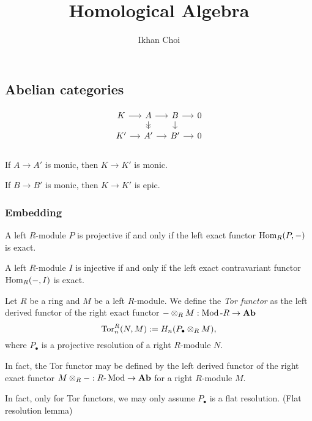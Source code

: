 \documentclass{../../large}
\newcommand{\Ab}{\mathbf{Ab}}
\begin{document}
\title{Homological Algebra}
\author{Ikhan Choi}
\maketitle
\tableofcontents


\part{}

\chapter{Abelian categories}

\[\begin{tikzcd}[sep=small]
K \rar & A \rar\dar[->>] & B \rar\dar & 0\\
K' \rar & A' \rar & B' \rar & 0\\
\end{tikzcd}\]
\begin{parts}
\item If $A\to A'$ is monic, then $K\to K'$ is monic.
\item If $B\to B'$ is monic, then $K\to K'$ is epic.
\end{parts}


\section{Embedding}

A left $R$-module $P$ is projective if and only if the left exact functor $\operatorname{Hom}_R(P,-)$ is exact.

A left $R$-module $I$ is injective if and only if the left exact contravariant functor $\operatorname{Hom}_R(-,I)$ is exact.


\begin{prb}
Let $R$ be a ring and $M$ be a left $R$-module.
We define the \emph{Tor functor} as the left derived functor of the right exact functor $-\otimes_RM:\Mod\text{-}R\to\Ab$
\[\operatorname{Tor}_n^R(N,M):=H_n(P_\bullet\otimes_RM),\]
where $P_\bullet$ is a projective resolution of a right $R$-module $N$.
\begin{parts}
\item In fact, the Tor functor may be defined by the left derived functor of the right exact functor $M\otimes_R-:R\text{-}\Mod\to\Ab$ for a right $R$-module $M$.
\item In fact, only for Tor functors, we may only assume $P_\bullet$ is a flat resolution. (Flat resolution lemma)
\end{parts}
\end{prb}
\end{document}
